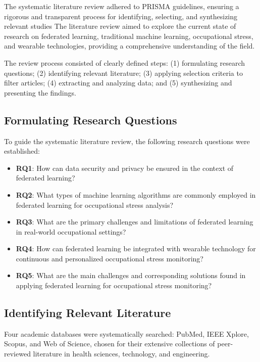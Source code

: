 \documentclass[12pt]{article}
\begin{document}
The systematic literature review adhered to PRISMA guidelines, ensuring a rigorous and transparent process for identifying, selecting, and synthesizing relevant studies \cite{ziyu_wang_a7666f66} The literature review aimed to explore the current state of research on federated learning, traditional machine learning, occupational stress, and wearable technologies, providing a comprehensive understanding of the field.

The review process consisted of clearly defined steps: (1) formulating research questions; (2) identifying relevant literature; (3) applying selection criteria to filter articles; (4) extracting and analyzing data; and (5) synthesizing and presenting the findings.


\subsection{Formulating Research Questions}

To guide the systematic literature review, the following research questions were established:
\begin{itemize}
    \item
    \textbf{RQ1}: How can data security and privacy be ensured in the context of federated learning?
    \item
    \textbf{RQ2}: What types of machine learning algorithms are commonly employed in federated learning for occupational stress analysis?
    \item
    \textbf{RQ3}: What are the primary challenges and limitations of federated learning in real-world occupational settings?
    \item
    \textbf{RQ4}: How can federated learning be integrated with wearable technology for continuous and personalized occupational stress monitoring?
    \item
    \textbf{RQ5}: What are the main challenges and corresponding solutions found in applying federated learning for occupational stress monitoring?
\end{itemize}

\subsection{Identifying Relevant Literature}


Four academic databases were systematically searched: PubMed, IEEE Xplore, Scopus, and Web of Science, chosen for their extensive collections of peer-reviewed literature in health sciences, technology, and engineering. 
\end{document}
